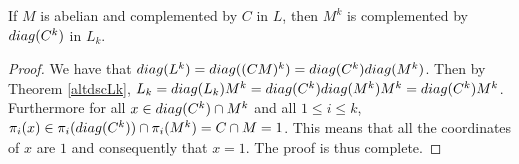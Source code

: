 \begin{theorem}
    If $M$ is abelian and complemented by $C$ in $L$, then $M^k$ is complemented by $diag({C^k})$ in $L_k$.
\end{theorem}

\begin{proof}
    We have that $diag({L^k}) = diag({(CM)^k}) = diag({C^k})diag({M^k})$. 
    Then by Theorem \ref{altdscLk}, $L_k = diag({L_k})M^k = diag({C^k})diag({M^k})M^k = diag({C^k})M^k$. 
    Furthermore for all $x \in diag({C^k}) \cap M^k$ and all $1 \le i \le k$, $\pi_i(x) \in \pi_i(diag({C^k})) \cap \pi_i(M^k) = C \cap M = 1$. 
    This means that all the coordinates of $x$ are $1$ and consequently that $x = 1$. The proof is thus complete.
\end{proof}
